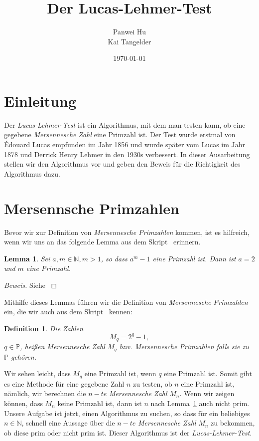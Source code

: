 \documentclass{article}
\title{Der Lucas-Lehmer-Test}
\date{\today}
\author{Panwei Hu \quad 374218\\Kai Tangelder \quad 358033}
\newtheorem{lemma}{Lemma}
\newtheorem{definition}{Definition}
\newcommand{\myparaDent}{12pt}
\newcommand{\Nature}{\ensuremath{\mathbb{N}}}
\newcommand{\myMersen}{\emph{Mersennesche Zahl}}
\begin{document}
  \maketitle
  \newpage
 \tableofcontents
	\newpage
  \newpage
\newpage
\section{Einleitung}
Der \emph{Lucas-Lehmer-Test} ist ein Algorithmus, mit dem man testen kann, ob eine gegebene
\myMersen{} eine Primzahl ist. Der Test wurde erstmal von Édouard Lucas empfunden im Jahr 1856 und wurde sp\"{a}ter vom Lucas im Jahr 1878 und Derrick Henry Lehmer in den 1930s verbessert. In dieser Ausarbeitung stellen wir den Algorithmus vor und geben den Beweis f\"{u}r die Richtigkeit des Algorithmus dazu.
\section{Mersennsche Primzahlen}
Bevor wir zur Definition von \emph{Mersennesche Primzahlen} kommen, ist es
hilfreich, wenn wir uns an das folgende Lemma aus dem Skript~\cite{script} erinnern.
\begin{lemma}\label{lem1}
	Sei $a,m \in \mathbb{N},m > 1$, so dass $a^m - 1$ eine Primzahl ist. Dann ist
	$a = 2$ und $m$ eine Primzahl.
\end{lemma}
\begin{proof}[Beweis]
Siehe \cite{script}
\end{proof}
Mithilfe dieses Lemmas f\"{u}hren wir die Definition von \emph{Mersennesche Primzahlen} ein, die wir auch aus dem Skript~\cite{script} kennen:
\begin{definition}
Die Zahlen
\[
	M_{q} = 2^{q} - 1,
\]
$q \in \mathbb{P}$, hei{\ss}en \emph{Mersennesche Zahl} $M_{q}$ bzw. \emph{Mersennesche Primzahlen} falls sie zu $\mathbb{P}$ geh\"{o}ren.
\end{definition}
Wir sehen leicht, dass $M_{q}$ eine Primzahl ist, wenn $q$ eine Primzahl ist.
Somit gibt es eine Methode f\"{u}r eine gegebene Zahl $n$ zu testen, ob $n$ eine Primzahl ist, n\"{a}mlich, wir berechnen die $n-te$ \emph{Mersennesche Zahl} $M_{n}$. Wenn wir zeigen k\"{o}nnen, dass $M_{n}$ keine Primzahl ist, dann ist $n$ nach Lemma~\ref{lem1} auch nicht prim.\\[\myparaDent]
Unsere Aufgabe ist jetzt, einen Algorithmus zu suchen, so dass f\"{u}r ein beliebiges $n \in \Nature$, schnell eine Aussage \"{u}ber die $n-te$ \emph{Mersennesche Zahl} $M_{n}$ zu bekommen, ob diese prim oder nicht prim ist. Dieser Algorithmus ist der \emph{Lucas-Lehmer-Test}. 
\end{document}
